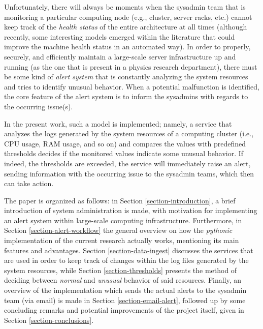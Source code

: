 \documentclass[conference]{IEEEtran}
\begin{document}
\par Unfortunately, there will always be moments when the sysadmin team that is monitoring a particular computing node (e.g., cluster, server racks, etc.) cannot keep track of the \emph{health status} of the entire architecture at all times (although recently, some interesting models emerged within the literature that could improve the machine health status \cite{hasani2019machine,lin2020health} in an automated way). In order to properly, securely, and efficiently maintain a large-scale server infrastructure up and running (as the one that is present in a physics research department), there must be some kind of \emph{alert system} that is constantly analyzing the system resources and tries to identify unusual behavior. When a potential malfunction is identified, the core feature of the alert system is to inform the sysadmins with regards to the occurring issue(s).
\par In the present work, such a model is implemented; namely, a service that analyzes the logs generated by the system resources of a computing cluster (i.e., CPU usage, RAM usage, and so on) and compares the values with predefined thresholds decides if the monitored values indicate some unusual behavior. If indeed, the thresholds are exceeded, the service will immediately raise an alert, sending information with the occurring issue to the sysadmin teams, which then can take action.
\par The paper is organized as follows: in Section \ref{section-introduction}, a brief introduction of system administration is made, with motivation for implementing an alert system within large-scale computing infrastructure. Furthermore, in Section \ref{section-alert-workflow} the general overview on how the \emph{pythonic} implementation of the current research actually works, mentioning its main features and advantages. Section \ref{section-data-ingest} discusses the services that are used in order to keep track of changes within the log files generated by the system resources, while Section \ref{section-thresholds} presents the method of deciding between \emph{normal} and \emph{unusual} behavior of said resources. Finally, an overview of the implementation which sends the actual alerts to the sysadmin team (via email) is made in Section \ref{section-email-alert}, followed up by some concluding remarks and potential improvements of the project itself, given in Section \ref{section-conclusions}.
\end{document}
